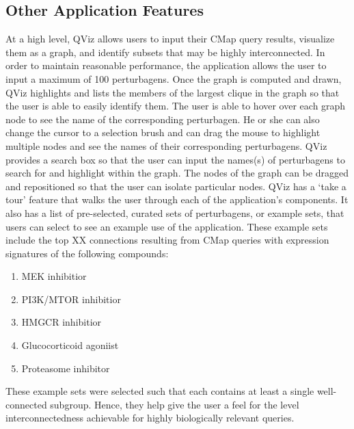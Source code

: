 \documentclass[12pt]{article}
\begin{document}
\subsection{Other Application Features}
At a high level, QViz allows users to input their CMap query results, visualize them as a graph, and identify subsets that may be highly interconnected. In order to maintain reasonable performance, the application allows the user to input a maximum of 100 perturbagens. Once the graph is computed and drawn, QViz highlights and lists the members of the largest clique in the graph so that the user is able to easily identify them. The user is able to hover over each graph node to see the name of the corresponding perturbagen. He or she can also change the cursor to a selection brush and can drag the mouse to highlight multiple nodes and see the names of their corresponding perturbagens. QViz provides a search box so that the user can input the names(s) of perturbagens to search for and highlight within the graph. The nodes of the graph can be dragged and repositioned so that the user can isolate particular nodes. 
QViz has a `take a tour' feature that walks the user through each of the application's components. It also has a list of pre-selected, curated sets of perturbagens, or example sets, that users can select to see an example use of the application. These example sets include the top XX connections resulting from CMap queries with expression signatures of the following compounds:

\begin{enumerate}
\item MEK inhibitior
\item PI3K/MTOR inhibitior
\item HMGCR inhibitior
\item Glucocorticoid agoniist
\item Proteasome inhibitor
\end{enumerate}

These example sets were selected such that each contains at least a single well-connected subgroup. Hence, they help give the user a feel for the level interconnectedness achievable for highly biologically relevant queries.

\end{document}
